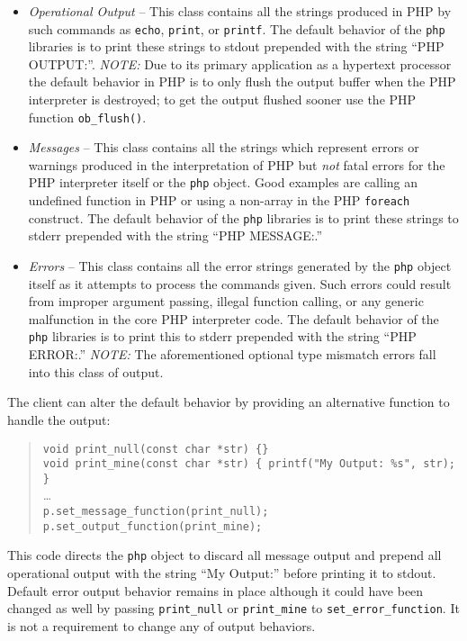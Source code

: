 \documentclass[11pt,titlepage]{article}
\begin{document}
\begin{itemize}
\item \emph{Operational Output} -- This class contains all the strings produced in PHP by such commands as \verb|echo|, \verb|print|, or \verb|printf|. The default behavior of the \verb|php| libraries is to print these strings to stdout prepended with the string ``PHP OUTPUT:''. \emph{NOTE:} Due to its primary application as a hypertext processor the default behavior in PHP is to only flush the output buffer when the PHP interpreter is destroyed; to get the output flushed sooner use the PHP function \verb|ob_flush()|.

\item \emph{Messages} -- This class contains all the strings which represent errors or warnings produced  in the interpretation of PHP but \emph{not} fatal errors for the PHP interpreter itself or the \verb|php| object. Good examples are calling an undefined function in PHP or using a non-array in the PHP \verb|foreach| construct. The default behavior of the \verb|php| libraries is to print these strings to stderr prepended with the string ``PHP MESSAGE:.''

\item \emph{Errors} -- This class contains all the error strings generated by the \verb|php| object itself as it attempts to process the commands given. Such errors could result from improper argument passing, illegal function calling, or any generic malfunction in the core PHP interpreter code. The default behavior of the \verb|php| libraries is to print this to stderr prepended with the string ``PHP ERROR:.'' \emph{NOTE:} The aforementioned optional type mismatch errors fall into this class of output.
\end{itemize}

The client can alter the default behavior by providing an alternative function to handle the output:

\begin{quote}
\verb|void print_null(const char *str) {}|\\
\verb|void print_mine(const char *str) { printf("My Output: %s", str); }|\\
\ldots\\
\verb|p.set_message_function(print_null);|\\
\verb|p.set_output_function(print_mine);|\\
\end{quote}

This code directs the \verb|php| object to discard all message output and prepend all operational output with the string ``My Output:'' before printing it to stdout. Default error output behavior remains in place although it could have been changed as well by passing \verb|print_null| or \verb|print_mine| to \verb|set_error_function|. It is not a requirement to change any of output behaviors.
\end{document}
